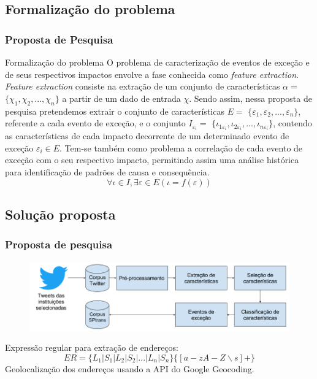 \documentclass{beamer}
\begin{document}
\subsection{Formalização do problema}
\begin{frame}
\frametitle{Proposta de Pesquisa}
\begin{block}{Formalização do problema}
O problema de caracterização de eventos de exceção e de seus respectivos impactos envolve a fase conhecida como \textit{feature extraction}. \textit{Feature extraction} consiste na extração de um conjunto de características ${\alpha =}$ $\lbrace {\chi_1}, {\chi_2}, ..., {\chi_n} \rbrace$ a partir de um dado de entrada $\chi$. Sendo assim, nessa proposta de pesquisa pretendemos extrair o conjunto de características ${E = }$ $\lbrace {\varepsilon_1}, {\varepsilon_2}, ..., {\varepsilon_n} \rbrace$, referente a cada evento de exceção, e o conjunto ${I_{\varepsilon_i} = }$ $\lbrace {\iota_{1\varepsilon_i}}, {\iota_{2\varepsilon_i}}, ..., {\iota_{n\varepsilon_i}} \rbrace$, contendo as características de cada impacto decorrente de um determinado evento de exceção $\varepsilon_i \in E$. \newline \newline Tem-se também como problema a correlação de cada evento de exceção com o seu respectivo impacto, permitindo assim uma análise histórica para identificação de padrões de causa e consequência.
\begin{equation*} 
\forall \iota \in I, \exists \varepsilon \in E (\iota = f(\varepsilon) ) 
\end{equation*}
\end{block}
\end{frame}
\subsection{Solução proposta}
\begin{frame}
\frametitle{Proposta de pesquisa}
\begin{figure}
\includegraphics[width=1\linewidth]{solution}
\end{figure}
Expressão regular para extração de endereços:
\begin{equation}
ER = \lbrace L_1|S_1|L_2|S_2|...|L_n|S_n \rbrace \lbrace [a-zA-Z \backslash s]+ \rbrace
\end{equation}
Geolocalização dos endereços usando a API do Google Geocoding.
\end{frame}
\end{document}
